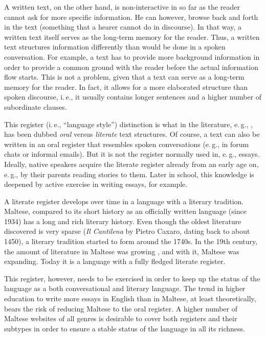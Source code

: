 \begin{multicols}{2}
A written text, on the other hand, is non-interactive in so far as the reader cannot ask for more specific information. He can however, browse back and forth in the text (something that a hearer cannot do in discourse). In that way, a written text itself serves as the long-term memory for the reader. Thus, a written text structures information differently than would be done in a spoken conversation. For example, a text has to provide more background information in order to provide a common ground with the reader before the actual information flow starts. This is not a problem, given that a text can serve as a long-term memory for the reader. In fact, it allows for a more elaborated structure than spoken discourse, i.\,e., it usually contains longer sentences and a higher number of subordinate clauses. 

This register (i.\,e., ``language style'') distinction is what in the literature, e.\,g., \cite{Biber:1991}, has been dubbed \emph{oral} versus \emph{literate} text structures. Of course, a text can also be written in an oral register that resembles spoken conversations (e.\,g., in forum chats or informal emails). But it is not the register normally used in, e.\,g., essays. Ideally, native speakers acquire the literate register already from an early age on, e.\,g., by their parents reading stories to them. Later in school, this knowledge is deepened by active exercise in writing essays, for example.

A literate register develops over time in a language with a literary tradition. Maltese, compared to its short history as an officially written language (since 1934) has a long and rich literary history. Even though the oldest literature discovered is very sparse (\emph{Il Cantilena} by Pietro Caxaro, dating back to about 1450), a literary tradition started to form around the 1740s. In the 19th century, the amount of literature in Maltese was growing \cite{Fabri:2011a}, and with it, Maltese was expanding. Today it is a language with a fully fledged literate register. 

This register, however, needs to be exercised in order to keep up the status of the language as a both conversational and literary language. The trend in higher education to write more essays in English than in Maltese, at least theoretically, bears the risk of reducing Maltese to the oral register. A higher number of Maltese websites of all genres is desirable to cover both registers and their subtypes in order to ensure a stable status of the language in all its richness.


\end{multicols}
